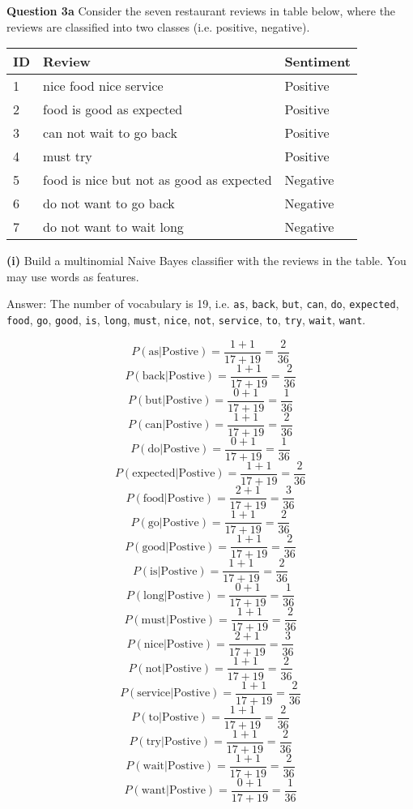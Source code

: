 \documentclass[11pt,a4paper]{report}
\begin{document}
\begin{multicols*}{2}
\noindent \textbf{Question 3a} Consider the seven restaurant reviews in table below, where the reviews are classified into two classes (i.e. positive, negative).

\begin{center}
\begin{tabular}{| l | p{5cm} | l |}
    \hline
    ID  & Review & Sentiment \\ \hline
    1   & nice food nice service & Positive \\
    2   & food is good as expected & Positive \\
    3   & can not wait to go back & Positive \\
    4   & must try & Positive \\
    5   & food is nice but not as good as expected & Negative \\
    6   & do not want to go back & Negative \\
    7   & do not want to wait long & Negative \\
    \hline
\end{tabular}
\end{center}

\noindent \textbf{(i)} Build a multinomial Naive Bayes classifier with the reviews in the table. You may use words as features.

\noindent Answer: The number of vocabulary is 19, i.e. \verb|as|, \verb|back|, \verb|but|, \verb|can|, \verb|do|, \verb|expected|, \verb|food|, \verb|go|, \verb|good|, \verb|is|, \verb|long|, \verb|must|, \verb|nice|, \verb|not|, \verb|service|, \verb|to|, \verb|try|, \verb|wait|, \verb|want|.

$$ P(\text{as} | \text{Postive} ) = \frac{1+ 1}{17 + 19} = \frac{2}{36}$$
$$ P(\text{back} | \text{Postive} ) = \frac{1+ 1}{17 + 19} = \frac{2}{36}$$
$$ P(\text{but} | \text{Postive} ) = \frac{0+ 1}{17 + 19} = \frac{1}{36}$$
$$ P(\text{can} | \text{Postive} ) = \frac{1+ 1}{17 + 19} = \frac{2}{36}$$
$$ P(\text{do} | \text{Postive} ) = \frac{0+ 1}{17 + 19} = \frac{1}{36}$$
$$ P(\text{expected} | \text{Postive} ) = \frac{1+ 1}{17 + 19} = \frac{2}{36}$$
$$ P(\text{food} | \text{Postive} ) = \frac{2+ 1}{17 + 19} = \frac{3}{36}$$
$$ P(\text{go} | \text{Postive} ) = \frac{1+ 1}{17 + 19} = \frac{2}{36}$$
$$ P(\text{good} | \text{Postive} ) = \frac{1+ 1}{17 + 19} = \frac{2}{36}$$
$$ P(\text{is} | \text{Postive} ) = \frac{1+ 1}{17 + 19} = \frac{2}{36}$$
$$ P(\text{long} | \text{Postive} ) = \frac{0+ 1}{17 + 19} = \frac{1}{36}$$
$$ P(\text{must} | \text{Postive} ) = \frac{1+ 1}{17 + 19} = \frac{2}{36}$$
$$ P(\text{nice} | \text{Postive} ) = \frac{2+ 1}{17 + 19} = \frac{3}{36}$$
$$ P(\text{not} | \text{Postive} ) = \frac{1+ 1}{17 + 19} = \frac{2}{36}$$
$$ P(\text{service} | \text{Postive} ) = \frac{1+ 1}{17 + 19} = \frac{2}{36}$$
$$ P(\text{to} | \text{Postive} ) = \frac{1+ 1}{17 + 19} = \frac{2}{36}$$
$$ P(\text{try} | \text{Postive} ) = \frac{1+ 1}{17 + 19} = \frac{2}{36}$$
$$ P(\text{wait} | \text{Postive} ) = \frac{1+ 1}{17 + 19} = \frac{2}{36}$$
$$ P(\text{want} | \text{Postive} ) = \frac{0+ 1}{17 + 19} = \frac{1}{36}$$


\end{multicols*}
\end{document}
